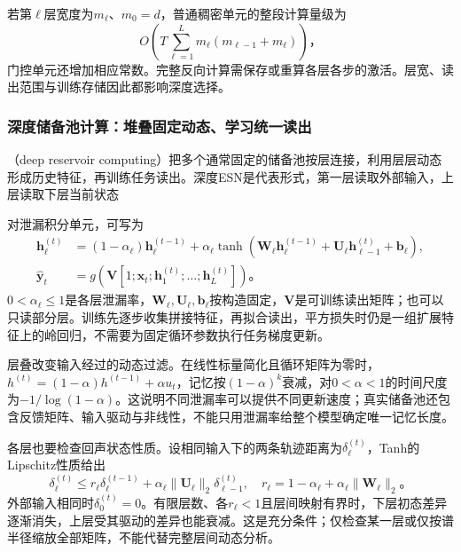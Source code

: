 若第$\ell$层宽度为$m_\ell$、$m_0=d$，普通稠密单元的整段计算量级为
\begin{equation}
  O\!\left(T\sum_{\ell=1}^{L}m_\ell(m_{\ell-1}+m_\ell)\right)\text{，}
  \label{eq:rnn-stacked-cost}
\end{equation}
门控单元还增加相应常数。完整反向计算需保存或重算各层各步的激活。层宽、读出范围与训练存储因此都影响深度选择。

\subsubsection{深度储备池计算：堆叠固定动态、学习统一读出}
\label{sec:rnn-deep-reservoir}

（deep reservoir computing）把多个通常固定的储备池按层连接，利用层层动态形成历史特征，再训练任务读出。深度ESN是代表形式，第一层读取外部输入，上层读取下层当前状态

对泄漏积分单元，可写为
\begin{equation}
  \begin{aligned}
    \bm h_\ell^{(t)}&=(1-\alpha_\ell)\bm h_\ell^{(t-1)}
      +\alpha_\ell\tanh\!\left(\bm W_\ell\bm h_\ell^{(t-1)}
               +\bm U_\ell\bm h_{\ell-1}^{(t)}+\bm b_\ell\right),\\
    \widehat{\bm y}_t&=g\!\left(\bm V
       [1;\bm x_t;\bm h_1^{(t)};\ldots;\bm h_L^{(t)}]\right)\text{。}
  \end{aligned}
  \label{eq:rnn-deep-esn}
\end{equation}
$0<\alpha_\ell\leq1$是各层泄漏率，$\bm W_\ell,\bm U_\ell,\bm b_\ell$按构造固定，$\bm V$是可训练读出矩阵；也可以只读部分层。训练先逐步收集拼接特征，再拟合读出，平方损失时仍是一组扩展特征上的岭回归，不需要为固定循环参数执行任务梯度更新。

层叠改变输入经过的动态过滤。在线性标量简化且循环矩阵为零时，$h^{(t)}=(1-\alpha)h^{(t-1)}+\alpha u_t$，记忆按$(1-\alpha)^k$衰减，对$0<\alpha<1$的时间尺度为$-1/\log(1-\alpha)$。这说明不同泄漏率可以提供不同更新速度；真实储备池还包含反馈矩阵、输入驱动与非线性，不能只用泄漏率给整个模型确定唯一记忆长度。

各层也要检查回声状态性质。设相同输入下的两条轨迹距离为$\delta_\ell^{(t)}$，Tanh的Lipschitz性质给出
\begin{equation}
  \delta_\ell^{(t)}\leq r_\ell\delta_\ell^{(t-1)}
       +\alpha_\ell\lVert\bm U_\ell\rVert_2\delta_{\ell-1}^{(t)},
  \quad r_\ell=1-\alpha_\ell+\alpha_\ell\lVert\bm W_\ell\rVert_2\text{。}
  \label{eq:rnn-deep-esn-contraction}
\end{equation}
外部输入相同时$\delta_0^{(t)}=0$。有限层数、各$r_\ell<1$且层间映射有界时，下层初态差异逐渐消失，上层受其驱动的差异也能衰减。这是充分条件；仅检查某一层或仅按谱半径缩放全部矩阵，不能代替完整层间动态分析。

